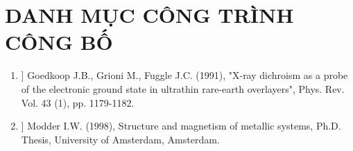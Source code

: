 \setcounter{chapter}{6}
\chapter*{DANH MỤC CÔNG TRÌNH CÔNG BỐ}
\fontsize{13pt}{25pt}\selectfont
\begin{enumerate}
	\item [[P1]] Goedkoop J.B., Grioni M., Fuggle J.C. (1991), "X-ray dichroism as a probe of the electronic ground state in ultrathin rare-earth overlayers", Phys. Rev. Vol. 43 (1), pp. 1179-1182.

    \item [[P2]] Modder I.W. (1998), Structure and magnetism of metallic systems, Ph.D. Thesis, University of Amsterdam, Amsterdam.

	\end{enumerate}
